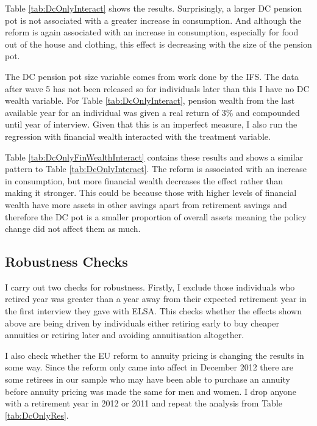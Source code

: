 \documentclass[12pt]{article}
\begin{document}
\begin{landscape}
    \linespread{1}
    
\end{landscape}

Table \ref{tab:DcOnlyInteract} shows the results. Surprisingly, a larger DC
pension pot is not associated with a greater increase in consumption. And
although the reform is again associated with an increase in consumption,
especially for food out of the house and clothing, this effect is decreasing
with the size of the pension pot.

The DC pension pot size variable comes from work done by the IFS. The data after
wave 5 has not been released so for individuals later than this I have no DC
wealth variable. For Table \ref{tab:DcOnlyInteract}, pension wealth from the
last available year for an individual was given a real return of 3\% and
compounded until year of interview. Given that this is an imperfect measure, I
also run the regression with financial wealth interacted with the treatment
variable.

Table \ref{tab:DcOnlyFinWealthInteract} contains these results and shows a
similar pattern to Table \ref{tab:DcOnlyInteract}. The reform is associated with
an increase in consumption, but more financial wealth decreases the effect
rather than making it stronger. This could be because those with higher levels
of financial wealth have more assets in other savings apart from retirement
savings \citep{cribb_karjalainen_ifs_2023} and therefore the DC pot is a smaller
proportion of overall assets meaning the policy change did not affect them as
much.

\subsection{Robustness Checks}

I carry out two checks for robustness. Firstly, I exclude those individuals who
retired year was greater than a year away from their expected retirement year in
the first interview they gave with ELSA. This checks whether the effects shown
above are being driven by individuals either retiring early to buy cheaper
annuities or retiring later and avoiding annuitisation altogether.

I also check whether the EU reform to annuity pricing is changing the results in
some way. Since the reform only came into affect in December 2012 there are some
retirees in our sample who may have been able to purchase an annuity before
annuity pricing was made the same for men and women. I drop anyone with a
retirement year in 2012 or 2011 and repeat the analysis from Table \ref{tab:DcOnlyRes}.
\end{document}
